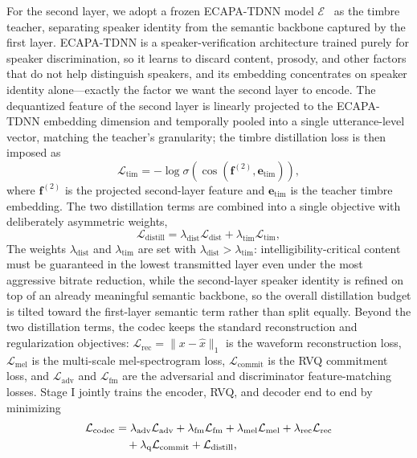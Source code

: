 \documentclass[lettersize,journal]{IEEEtran}
\begin{document}
For the second layer, we adopt a frozen ECAPA-TDNN model $\mathcal{E}$~\cite{desplanques2020ecapa} as the timbre teacher, separating speaker identity from the semantic backbone captured by the first layer. ECAPA-TDNN is a speaker-verification architecture trained purely for speaker discrimination, so it learns to discard content, prosody, and other factors that do not help distinguish speakers, and its embedding concentrates on speaker identity alone---exactly the factor we want the second layer to encode. The dequantized feature of the second layer is linearly projected to the ECAPA-TDNN embedding dimension and temporally pooled into a single utterance-level vector, matching the teacher's granularity; the timbre distillation loss is then imposed as
\begin{equation}
\mathcal{L}_{\mathrm{tim}}=-\log\sigma\!\left(\cos(\mathbf{f}^{(2)},\mathbf{e}_{\mathrm{tim}})\right),
\end{equation}
where $\mathbf{f}^{(2)}$ is the projected second-layer feature and $\mathbf{e}_{\mathrm{tim}}$ is the teacher timbre embedding. The two distillation terms are combined into a single objective with deliberately asymmetric weights,
\begin{equation}
\mathcal{L}_{\mathrm{distill}}=\lambda_{\mathrm{dist}}\mathcal{L}_{\mathrm{dist}}+\lambda_{\mathrm{tim}}\mathcal{L}_{\mathrm{tim}},
\label{eq:distill}
\end{equation}
The weights $\lambda_{\mathrm{dist}}$ and $\lambda_{\mathrm{tim}}$ are set with $\lambda_{\mathrm{dist}}>\lambda_{\mathrm{tim}}$: intelligibility-critical content must be guaranteed in the lowest transmitted layer even under the most aggressive bitrate reduction, while the second-layer speaker identity is refined on top of an already meaningful semantic backbone, so the overall distillation budget is tilted toward the first-layer semantic term rather than split equally.
Beyond the two distillation terms, the codec keeps the standard reconstruction and regularization objectives: $\mathcal{L}_{\mathrm{rec}}=\|x-\hat{x}\|_1$ is the waveform reconstruction loss, $\mathcal{L}_{\mathrm{mel}}$ is the multi-scale mel-spectrogram loss, $\mathcal{L}_{\mathrm{commit}}$ is the RVQ commitment loss, and $\mathcal{L}_{\mathrm{adv}}$ and $\mathcal{L}_{\mathrm{fm}}$ are the adversarial and discriminator feature-matching losses. Stage I jointly trains the encoder, RVQ, and decoder end to end by minimizing
\begin{align}
\mathcal{L}_{\mathrm{codec}}&=\lambda_{\mathrm{adv}}\mathcal{L}_{\mathrm{adv}}+\lambda_{\mathrm{fm}}\mathcal{L}_{\mathrm{fm}}+
\lambda_{\mathrm{mel}}\mathcal{L}_{\mathrm{mel}}+\lambda_{\mathrm{rec}}\mathcal{L}_{\mathrm{rec}}\notag\\
&\quad+\lambda_{\mathrm{q}}\mathcal{L}_{\mathrm{commit}}+\mathcal{L}_{\mathrm{distill}},
\label{eq:codec_loss}
\end{align}
\end{document}
